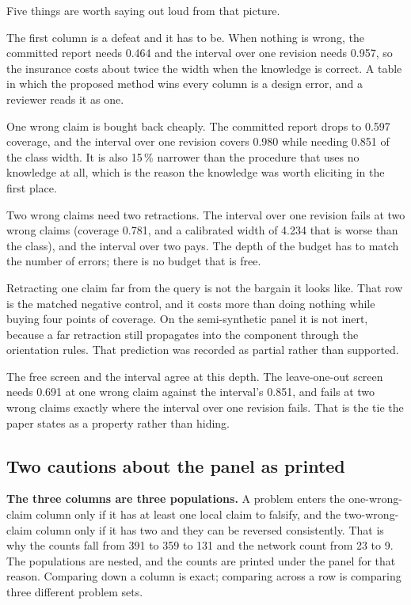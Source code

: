 Five things are worth saying out loud from that picture.

The first column is a defeat and it has to be. When nothing is wrong, the committed report needs
0.464 and the interval over one revision needs 0.957, so the insurance costs about twice the width
when the knowledge is correct. A table in which the proposed method wins every column is a design
error, and a reviewer reads it as one.

One wrong claim is bought back cheaply. The committed report drops to 0.597 coverage, and the
interval over one revision covers 0.980 while needing 0.851 of the class width. It is also 15\,\% narrower than the procedure that uses no knowledge at all, which is the
reason the knowledge was worth eliciting in the first place.

Two wrong claims need two retractions. The interval over one revision fails at two wrong claims
(coverage 0.781, and a calibrated width of 4.234 that is worse than the class), and the interval
over two pays. The depth of the budget has to match the number of errors; there is no budget that is
free.

Retracting one claim far from the query is not the bargain it looks like. That row is the matched
negative control, and it costs more than doing nothing while buying four points of coverage. On the
semi-synthetic panel it is not inert, because a far retraction still propagates into the component
through the orientation rules. That prediction was recorded as partial rather than supported.

The free screen and the interval agree at this depth. The leave-one-out screen needs 0.691 at one
wrong claim against the interval's 0.851, and fails at two wrong claims exactly where the interval
over one revision fails. That is the tie the paper states as a property rather than hiding.

\subsection{Two cautions about the panel as printed}

\textbf{The three columns are three populations.} A problem enters the one-wrong-claim column only
if it has at least one local claim to falsify, and the two-wrong-claim column only if it has two and
they can be reversed consistently. That is why the counts fall from 391 to 359 to 131 and the
network count from 23 to 9. The populations are nested, and the counts are printed under the panel
for that reason. Comparing down a column is exact; comparing across a row is comparing three
different problem sets.

